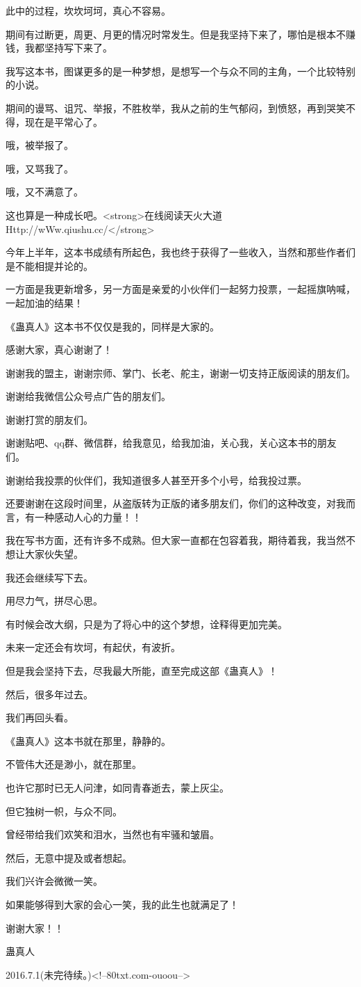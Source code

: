 \begin{this_body}
此中的过程，坎坎坷坷，真心不容易。

期间有过断更，周更、月更的情况时常发生。但是我坚持下来了，哪怕是根本不赚钱，我都坚持写下来了。

我写这本书，图谋更多的是一种梦想，是想写一个与众不同的主角，一个比较特别的小说。

期间的谩骂、诅咒、举报，不胜枚举，我从之前的生气郁闷，到愤怒，再到哭笑不得，现在是平常心了。

哦，被举报了。

哦，又骂我了。

哦，又不满意了。

这也算是一种成长吧。<strong>在线阅读天火大道Http://wWw.qiushu.cc/</strong>

今年上半年，这本书成绩有所起色，我也终于获得了一些收入，当然和那些作者们是不能相提并论的。

一方面是我更新增多，另一方面是亲爱的小伙伴们一起努力投票，一起摇旗呐喊，一起加油的结果！

《蛊真人》这本书不仅仅是我的，同样是大家的。

感谢大家，真心谢谢了！

谢谢我的盟主，谢谢宗师、掌门、长老、舵主，谢谢一切支持正版阅读的朋友们。

谢谢给我微信公众号点广告的朋友们。

谢谢打赏的朋友们。

谢谢贴吧、qq群、微信群，给我意见，给我加油，关心我，关心这本书的朋友们。

谢谢给我投票的伙伴们，我知道很多人甚至开多个小号，给我投过票。

还要谢谢在这段时间里，从盗版转为正版的诸多朋友们，你们的这种改变，对我而言，有一种感动人心的力量！！

我在写书方面，还有许多不成熟。但大家一直都在包容着我，期待着我，我当然不想让大家伙失望。

我还会继续写下去。

用尽力气，拼尽心思。

有时候会改大纲，只是为了将心中的这个梦想，诠释得更加完美。

未来一定还会有坎坷，有起伏，有波折。

但是我会坚持下去，尽我最大所能，直至完成这部《蛊真人》！

然后，很多年过去。

我们再回头看。

《蛊真人》这本书就在那里，静静的。

不管伟大还是渺小，就在那里。

也许它那时已无人问津，如同青春逝去，蒙上灰尘。

但它独树一帜，与众不同。

曾经带给我们欢笑和泪水，当然也有牢骚和皱眉。

然后，无意中提及或者想起。

我们兴许会微微一笑。

如果能够得到大家的会心一笑，我的此生也就满足了！

谢谢大家！！

蛊真人

2016.7.1(未完待续。)<!--80txt.com-ouoou-->

\end{this_body}

